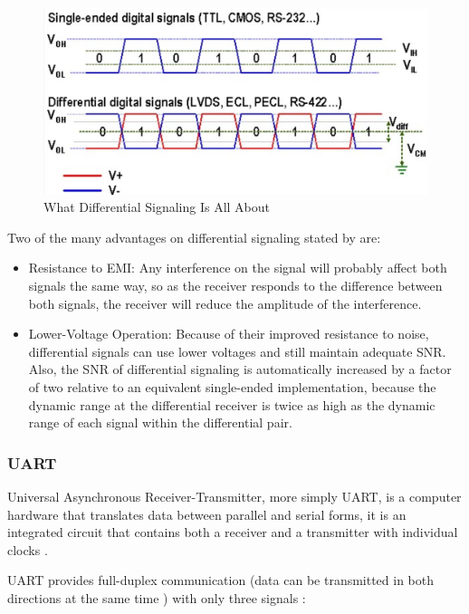 		\begin{figure}[htbp]
			\centering
				\includegraphics[scale=0.8]{figuras/fig-diff-signaling}
			\caption{What Differential Signaling Is All About \cite{diff-signaling-autodesk}}
			\label{fig:diff-signaling}
		\end{figure}

	Two of the many advantages on differential signaling stated by \cite{pinkle2016dif} are:

	\begin{itemize}
		\item Resistance to EMI: Any interference on the signal will probably affect both signals the same way, so as the receiver responds to the difference between both signals, the receiver will reduce the amplitude of the interference.
		\item Lower-Voltage Operation: Because of their improved resistance to noise, differential signals can use lower voltages and still maintain adequate SNR. Also, the SNR of differential signaling is automatically increased by a factor of two relative to an equivalent single-ended implementation, because the dynamic range at the differential receiver is twice as high as the dynamic range of each signal within the differential pair.
	\end{itemize}


\subsubsection{UART}\label{sssec:uart}
	Universal Asynchronous Receiver-Transmitter, more simply UART, is a computer hardware that translates data between parallel and serial forms, it is an integrated circuit that contains both a receiver and a transmitter with individual clocks \cite{futureUart}.
	\par
	UART provides full-duplex communication (data can be transmitted in both directions at the same time \cite{radunovic2011full}) with only three signals \cite{keimUart2016}:
	

